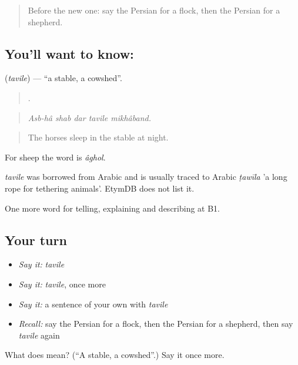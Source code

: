 \begin{quote}
Before the new one: say the Persian for a flock, then the Persian for a shepherd.
\end{quote}

\subsection*{You'll want to know: }
\textbf{} (\emph{tavile}) — \textquotedblleft{}a stable, a cowshed\textquotedblright{}.

\begin{quote}
    .
\end{quote}

\begin{quote}
\emph{Asb-hâ shab dar tavile mikhâband.}
\end{quote}

\begin{quote}
The horses sleep in the stable at night.
\end{quote}

For sheep the word is \emph{âghol}.

\begin{cousinweb}
\emph{tavile} was borrowed from Arabic and is usually traced to Arabic \emph{ṭawīla} 'a long rope for tethering animals'. EtymDB does not list it.
\end{cousinweb}

\begin{grammarlens}[title={What you've built}]
One more word for telling, explaining and describing at B1.
\end{grammarlens}

\subsection*{Your turn}
\begin{itemize}
\raggedright
  \item \emph{Say it:} \emph{tavile}
  \item \emph{Say it:} \emph{tavile}, once more
  \item \emph{Say it:} a sentence of your own with \emph{tavile}
  \item \emph{Recall:} say the Persian for a flock, then the Persian for a shepherd, then say \emph{tavile} again
\end{itemize}

\begin{tcolorbox}[breakable,colback=teal!4,colframe=teal!35!black,title={Before you move on}]
What does  mean? (\textquotedblleft{}A stable, a cowshed\textquotedblright{}.) Say it once more.
\end{tcolorbox}

